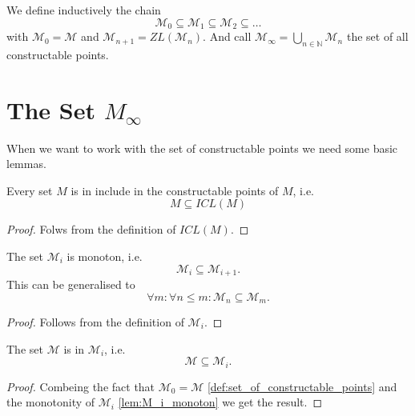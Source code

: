 \begin{definition}
    \label{def:set_of_constructable_points}
    \leanok
    We define inductively the chain
    \begin{equation*}
        \mathcal{M}_0 \subseteq \mathcal{M}_1 \subseteq \mathcal{M}_2 \subseteq \dots
    \end{equation*}
    with $\mathcal{M}_0 = \mathcal{M}$ and $\mathcal{M}_{n+1} = ZL(\mathcal{M}_n)$.\newline
    And call $\mathcal{M}_{\infty} = \bigcup_{n \in \mathbb{N}} \mathcal{M}_n$ the set of all constructable points.
\end{definition}

\section[The set of constructable points]{The Set $M_{\infty}$}\label{set_of_constructable_points}
When we want to work with the set of constructable points we need some basic lemmas.

\begin{lemma}
    \label{lem:M_in_ICL_M}
    \leanok
    Every set $M$ is in include in the constructable points of $M$, i.e.
    \[M \subseteq ICL(M)\]
\end{lemma}
\begin{proof}
    Folws from the definition of $ICL(M)$.
\end{proof}

\begin{lemma}
    \label{lem:M_i_monoton}
    \leanok
    The set $\mathcal{M}_i$ is monoton, i.e. $$\mathcal{M}_i \subseteq \mathcal{M}_{i+1}.$$
    This can be generalised to $$\forall m :\forall n\le m : \mathcal{M}_n \subseteq \mathcal{M}_m.$$
\end{lemma}
\begin{proof}
    Follows from the definition of $\mathcal{M}_i$.
\end{proof}

\begin{lemma}
    \label{lem:M_in_Mi}
    \leanok
    The set $\mathcal{M}$ is in $\mathcal{M}_i$, i.e. $$\mathcal{M} \subseteq \mathcal{M}_i.$$
\end{lemma}
\begin{proof}
    Combeing the fact that $\mathcal{M}_0 = \mathcal{M}$ \ref{def:set_of_constructable_points} and the monotonity of $\mathcal{M}_i$ \ref{lem:M_i_monoton} we get the result.
\end{proof}

